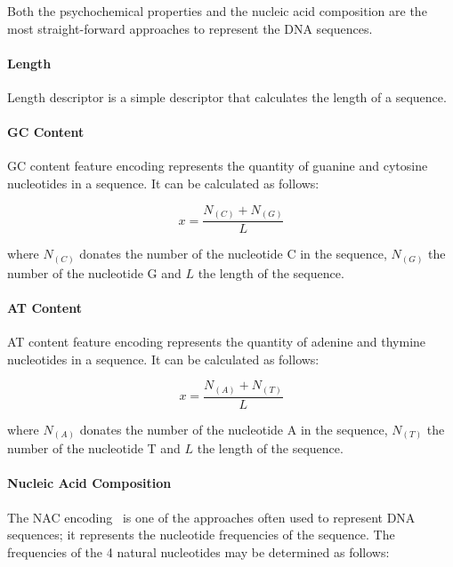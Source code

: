 Both the psychochemical properties and the nucleic acid composition are the most straight-forward approaches to represent the \gls{DNA} sequences. 

\paragraph{Length}

Length descriptor is a simple descriptor that calculates the length of a sequence.

\paragraph{GC Content}

\gls{GC} content feature encoding represents the quantity of guanine and cytosine nucleotides in a sequence. It can be calculated as follows:

\begin{equation}\label{eq:gc_content}
    x = \frac{N_{(C)} + N_{(G)}}{L}
\end{equation}


\noindent where $N_{(C)}$ donates the number of the nucleotide C in the sequence, $N_{(G)}$ the number of the nucleotide G and $L$ the length of the sequence.

\paragraph{AT Content}

\gls{AT} content feature encoding represents the quantity of adenine and thymine nucleotides in a sequence. It can be calculated as follows:


\begin{equation}\label{eq:at_content}
    x = \frac{N_{(A)} + N_{(T)}}{L}
\end{equation}

\noindent where $N_{(A)}$ donates the number of the nucleotide A in the sequence, $N_{(T)}$ the number of the nucleotide T and $L$ the length of the sequence.


\paragraph{Nucleic Acid Composition}

The \gls{NAC} encoding~\cite{Chen2015IRNA-Methyl:Composition,Chen2013IRSpot-PseDNC:Composition} is one of the approaches often used to represent \gls{DNA} sequences; it represents the nucleotide frequencies of the sequence. The frequencies of the 4 natural nucleotides may be determined as follows:

